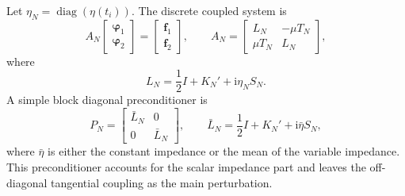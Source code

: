 \documentclass[11pt]{article}
\numberwithin{equation}{section}
\newcommand{\ii}{\mathrm{i}}
\begin{document}
Let $\eta_N=\operatorname{diag}(\eta(t_i))$. The discrete coupled system is
\begin{equation}
A_N
\begin{bmatrix}\bm\varphi_1\\ \bm\varphi_2\end{bmatrix}
=
\begin{bmatrix}\bm f_1\\ \bm f_2\end{bmatrix},
\qquad
A_N=
\begin{bmatrix}
L_N&-\mu T_N\\
\mu T_N&L_N
\end{bmatrix},
\label{eq:disc_system_en}
\end{equation}
where
\begin{equation}
L_N=\frac12 I+K_N'+\ii\eta_NS_N .
\end{equation}
A simple block diagonal preconditioner is
\begin{equation}
P_N=
\begin{bmatrix}
\bar L_N&0\\
0&\bar L_N
\end{bmatrix},
\qquad
\bar L_N=\frac12 I+K_N'+\ii\bar\eta S_N ,
\label{eq:preconditioner_en}
\end{equation}
where $\bar\eta$ is either the constant impedance or the mean of the variable impedance. This preconditioner accounts for the scalar impedance part and leaves the off-diagonal tangential coupling as the main perturbation.
\end{document}
